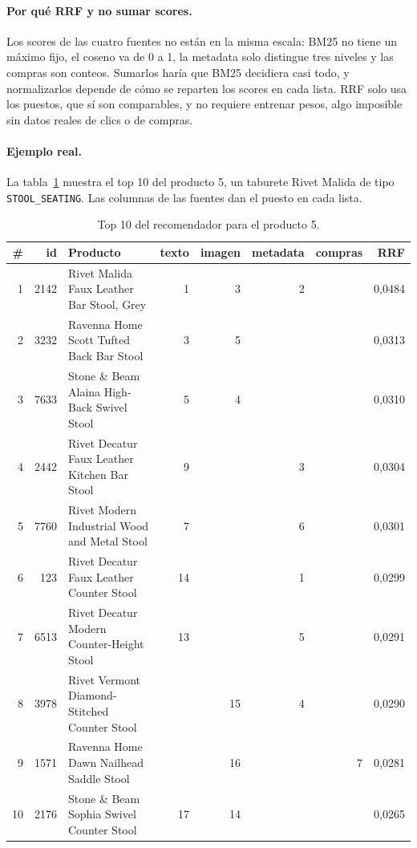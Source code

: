 \documentclass[11pt,a4paper]{article}
\begin{document}
\paragraph{Por qué RRF y no sumar scores.} Los scores de las cuatro fuentes no están en la misma escala: BM25 no tiene un máximo fijo, el coseno va de 0 a 1, la metadata solo distingue tres niveles y las compras son conteos. Sumarlos haría que BM25 decidiera casi todo, y normalizarlos depende de cómo se reparten los scores en cada lista. RRF solo usa los puestos, que sí son comparables, y no requiere entrenar pesos, algo imposible sin datos reales de clics o de compras.

\paragraph{Ejemplo real.} La tabla~\ref{tab:rrf} muestra el top 10 del producto 5, un taburete Rivet Malida de tipo \texttt{STOOL\_SEATING}. Las columnas de las fuentes dan el puesto en cada lista.

\begin{table}[H]
\centering
\footnotesize
\setlength{\tabcolsep}{4pt}
\begin{tabular}{rrlrrrrr}
\toprule
\# & id & Producto & texto & imagen & metadata & compras & RRF \\
\midrule
1 & 2142 & Rivet Malida Faux Leather Bar Stool, Grey & 1 & 3 & 2 & & 0,0484 \\
2 & 3232 & Ravenna Home Scott Tufted Back Bar Stool & 3 & 5 & & & 0,0313 \\
3 & 7633 & Stone \& Beam Alaina High-Back Swivel Stool & 5 & 4 & & & 0,0310 \\
4 & 2442 & Rivet Decatur Faux Leather Kitchen Bar Stool & 9 & & 3 & & 0,0304 \\
5 & 7760 & Rivet Modern Industrial Wood and Metal Stool & 7 & & 6 & & 0,0301 \\
6 & 123 & Rivet Decatur Faux Leather Counter Stool & 14 & & 1 & & 0,0299 \\
7 & 6513 & Rivet Decatur Modern Counter-Height Stool & 13 & & 5 & & 0,0291 \\
8 & 3978 & Rivet Vermont Diamond-Stitched Counter Stool & & 15 & 4 & & 0,0290 \\
9 & 1571 & Ravenna Home Dawn Nailhead Saddle Stool & & 16 & & 7 & 0,0281 \\
10 & 2176 & Stone \& Beam Sophia Swivel Counter Stool & 17 & 14 & & & 0,0265 \\
\bottomrule
\end{tabular}
\caption{Top 10 del recomendador para el producto 5.}
\label{tab:rrf}
\end{table}
\end{document}
